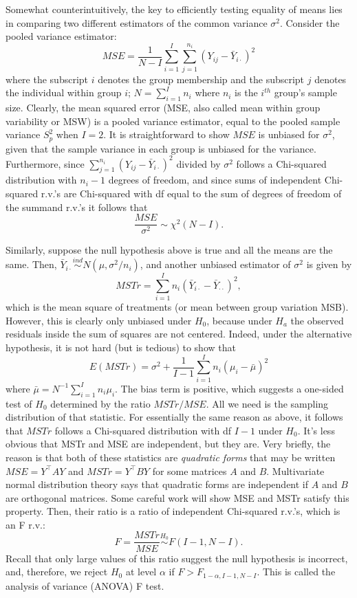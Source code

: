 \documentclass[
]{book}
\begin{document}
Somewhat counterintuitively, the key to efficiently testing equality of means lies in comparing two different estimators of the common variance \(\sigma^2\). Consider the pooled variance estimator:
\[MSE = \frac{1}{N-I}\sum_{i=1}^I\sum_{j=1}^{n_i}(Y_{ij} - \bar Y_{i\cdot})^2\]
where the subscript \(i\) denotes the group membership and the subscript \(j\) denotes the individual within group \(i\); \(N = \sum_{i=1}^I n_i\) where \(n_i\) is the \(i^{th}\) group's sample size. Clearly, the mean squared error (MSE, also called mean within group variability or MSW) is a pooled variance estimator, equal to the pooled sample variance \(S_p^2\) when \(I=2\). It is straightforward to show \(MSE\) is unbiased for \(\sigma^2\), given that the sample variance in each group is unbiased for the variance. Furthermore, since \(\sum_{j=1}^{n_i}(Y_{ij} - \bar Y_{i\cdot})^2\) divided by \(\sigma^2\) follows a Chi-squared distribution with \(n_i - 1\) degrees of freedom, and since sums of independent Chi-squared r.v.'s are Chi-squared with df equal to the sum of degrees of freedom of the summand r.v.'s it follows that
\[\frac{MSE}{\sigma^2}\sim \chi^2(N-I).\]

Similarly, suppose the null hypothesis above is true and all the means are the same. Then, \(\bar Y_{i\cdot}\stackrel{ind}{\sim}N(\mu, \sigma^2/n_i)\), and another unbiased estimator of \(\sigma^2\) is given by
\[MSTr = \sum_{i=1}^I n_i(\bar Y_{i\cdot}-\bar Y_{\cdot\cdot})^2,\]
which is the mean square of treatments (or mean between group variation MSB). However, this is clearly only unbiased under \(H_0\), because under \(H_a\) the observed residuals inside the sum of squares are not centered. Indeed, under the alternative hypothesis, it is not hard (but is tedious) to show that
\[E(MSTr) = \sigma^2 + \frac{1}{I-1}\sum_{i=1}^I n_i(\mu_i - \bar\mu)^2\]
where \(\bar\mu = N^{-1}\sum_{i=1}^In_i\mu_i\). The bias term is positive, which suggests a one-sided test of \(H_0\) determined by the ratio \(MSTr/MSE\). All we need is the sampling distribution of that statistic. For essentially the same reason as above, it follows that \(MSTr\) follows a Chi-squared distribution with df \(I-1\) under \(H_0\). It's less obvious that MSTr and MSE are independent, but they are. Very briefly, the reason is that both of these statistics are \emph{quadratic forms} that may be written \(MSE = Y^\top AY\) and \(MSTr = Y^\top BY\) for some matrices \(A\) and \(B\). Multivariate normal distribution theory says that quadratic forms are independent if \(A\) and \(B\) are orthogonal matrices. Some careful work will show MSE and MSTr satisfy this property. Then, their ratio is a ratio of independent Chi-squared r.v.'s, which is an F r.v.:
\[F=\frac{MSTr}{MSE}\stackrel{H_0}{\sim}F(I-1, N-I).\]
Recall that only large values of this ratio suggest the null hypothesis is incorrect, and, therefore, we reject \(H_0\) at level \(\alpha\) if \(F>F_{1-\alpha, I-1, N-I}\). This is called the analysis of variance (ANOVA) F test.
\end{document}

